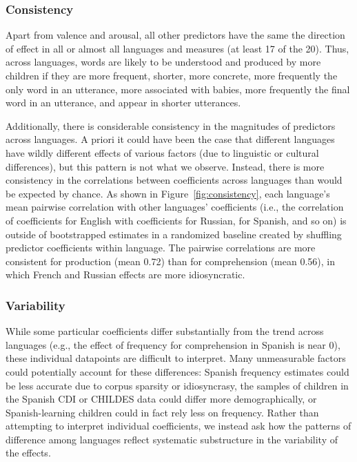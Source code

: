 \documentclass[manuscript]{stjour}
\begin{document}
\subsubsection{Consistency}

Apart from valence and arousal, all other predictors have the same the
direction of effect in all or almost all languages and measures (at
least 17 of the 20). Thus, across languages, words are likely to be
understood and produced by more children if they are more frequent,
shorter, more concrete, more frequently the only word in an utterance,
more associated with babies, more frequently the final word in an
utterance, and appear in shorter utterances.

Additionally, there is considerable consistency in the magnitudes of
predictors across languages. A priori it could have been the case that
different languages have wildly different effects of various factors
(due to linguistic or cultural differences), but this pattern is not
what we observe. Instead, there is more consistency in the correlations
between coefficients across languages than would be expected by chance.
As shown in Figure~\ref{fig:consistency}, each language's mean pairwise
correlation with other languages' coefficients (i.e., the correlation of
coefficients for English with coefficients for Russian, for Spanish, and
so on) is outside of bootstrapped estimates in a randomized baseline
created by shuffling predictor coefficients within language. The
pairwise correlations are more consistent for production (mean 0.72)
than for comprehension (mean 0.56), in which French and Russian effects
are more idiosyncratic.

\subsubsection{Variability}

While some particular coefficients differ substantially from the trend
across languages (e.g., the effect of frequency for comprehension in
Spanish is near 0), these individual datapoints are difficult to
interpret. Many unmeasurable factors could potentially account for these
differences: Spanish frequency estimates could be less accurate due to
corpus sparsity or idiosyncrasy, the samples of children in the Spanish
CDI or CHILDES data could differ more demographically, or
Spanish-learning children could in fact rely less on frequency. Rather
than attempting to interpret individual coefficients, we instead ask how
the patterns of difference among languages reflect systematic
substructure in the variability of the effects.
\end{document}

